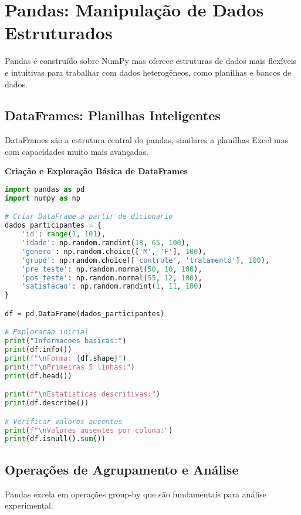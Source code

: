 \section{Pandas: Manipulação de Dados Estruturados}

Pandas é construído sobre NumPy mas oferece estruturas de dados mais flexíveis e intuitivas para trabalhar com dados heterogêneos, como planilhas e bancos de dados.

\subsection{DataFrames: Planilhas Inteligentes}

DataFrames são a estrutura central do pandas, similares a planilhas Excel mas com capacidades muito mais avançadas.

\begin{examplebox}
\textbf{Criação e Exploração Básica de DataFrames}

\begin{lstlisting}[language=Python]
import pandas as pd
import numpy as np

# Criar DataFrame a partir de dicionario
dados_participantes = {
    'id': range(1, 101),
    'idade': np.random.randint(18, 65, 100),
    'genero': np.random.choice(['M', 'F'], 100),
    'grupo': np.random.choice(['controle', 'tratamento'], 100),
    'pre_teste': np.random.normal(50, 10, 100),
    'pos_teste': np.random.normal(55, 12, 100),
    'satisfacao': np.random.randint(1, 11, 100)
}

df = pd.DataFrame(dados_participantes)

# Exploracao inicial
print("Informacoes basicas:")
print(df.info())
print(f"\nForma: {df.shape}")
print(f"\nPrimeiras 5 linhas:")
print(df.head())

print(f"\nEstatisticas descritivas:")
print(df.describe())

# Verificar valores ausentes
print(f"\nValores ausentes por coluna:")
print(df.isnull().sum())
\end{lstlisting}
\end{examplebox}

\subsection{Operações de Agrupamento e Análise}

Pandas excela em operações group-by que são fundamentais para análise experimental.

